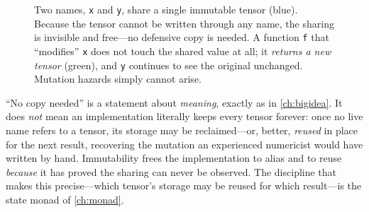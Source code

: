 \begin{figure}[t]
\centering
{}
\caption[Aliasing is safe under immutability]{Two names, \texttt{x} and
\texttt{y}, share a single immutable tensor (blue). Because the tensor cannot be
written through any name, the sharing is invisible and free---no defensive copy
is needed. A function \texttt{f} that ``modifies'' \texttt{x} does not touch the
shared value at all; it \emph{returns a new tensor} (green), and \texttt{y}
continues to see the original unchanged. Mutation hazards simply cannot arise.}
\label{fig:t-aliasing}
\end{figure}

\begin{pitfall}
``No copy needed'' is a statement about \emph{meaning}, exactly as in
\cref{ch:bigidea}. It does \emph{not} mean an implementation literally keeps
every tensor forever: once no live name refers to a tensor, its storage may be
reclaimed---or, better, \emph{reused} in place for the next result, recovering the
mutation an experienced numericist would have written by hand. Immutability frees
the implementation to alias and to reuse \emph{because} it has proved the sharing
can never be observed. The discipline that makes this precise---which tensor's
storage may be reused for which result---is the state monad of \cref{ch:monad}.
\end{pitfall}


